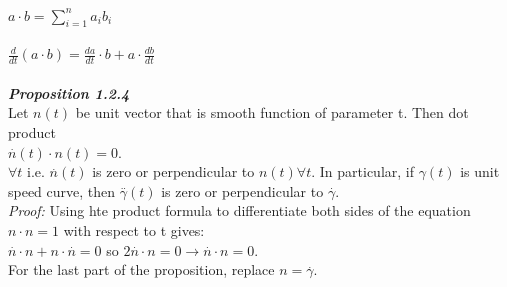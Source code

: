 \documentclass[12pt]{article}
\begin{document}
\( a \cdot b = \sum_{i=1}^{n} a_i b_i \) \\
\\
\( \frac{d}{dt} (a \cdot b) = \frac{da}{dt} \cdot b + a \cdot \frac{db}{dt} \)
\\
\\
\emph{\bfseries Proposition 1.2.4} \\
Let \( n(t) \) be unit vector that is smooth function of parameter t. Then dot product \\
\( \overset{.}{n}(t) \cdot n(t) = 0 \). \\
\( \forall t \) i.e. \( \overset{.}{n}(t) \) is zero or perpendicular to \( n(t) \forall t \). In particular, if \( \gamma(t) \) is unit speed curve, then \( \overset{..}{\gamma}(t) \) is zero or perpendicular to \( \overset{.}{\gamma} \).
\\
\emph{Proof: } Using hte product formula to differentiate both sides of the equation \( n \cdot n = 1 \) with respect to t gives: \\
\( \overset{.}{n} \cdot n + n \cdot \overset{.}{n} = 0 \) so \( 2 \overset{.}{n} \cdot n = 0 \longrightarrow \overset{.}{n} \cdot n = 0 \). \\
For the last part of the proposition, replace \( n = \overset{.}{\gamma} \).
\end{document}

